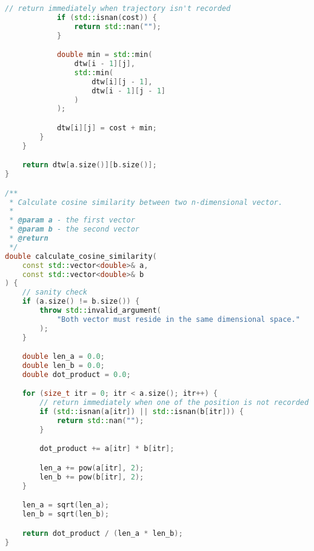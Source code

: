 \begin{lstlisting}[language=C++, caption=Implementasi 
modul \texttt{spatial.cpp},label={lamp:module-spatial}]
            // return immediately when trajectory isn't recorded
            if (std::isnan(cost)) {
                return std::nan("");
            }

            double min = std::min(
                dtw[i - 1][j],
                std::min(
                    dtw[i][j - 1],
                    dtw[i - 1][j - 1]
                )
            );

            dtw[i][j] = cost + min;
        }
    }

    return dtw[a.size()][b.size()];
}

/**
 * Calculate cosine similarity between two n-dimensional vector.
 * 
 * @param a - the first vector
 * @param b - the second vector
 * @return 
 */
double calculate_cosine_similarity(
    const std::vector<double>& a,
    const std::vector<double>& b
) {
    // sanity check
    if (a.size() != b.size()) {
        throw std::invalid_argument(
            "Both vector must reside in the same dimensional space."
        );
    }

    double len_a = 0.0;
    double len_b = 0.0;
    double dot_product = 0.0;

    for (size_t itr = 0; itr < a.size(); itr++) {
        // return immediately when one of the position is not recorded
        if (std::isnan(a[itr]) || std::isnan(b[itr])) {
            return std::nan("");
        }

        dot_product += a[itr] * b[itr];

        len_a += pow(a[itr], 2);
        len_b += pow(b[itr], 2);
    }

    len_a = sqrt(len_a);
    len_b = sqrt(len_b);

    return dot_product / (len_a * len_b);
}
\end{lstlisting}

